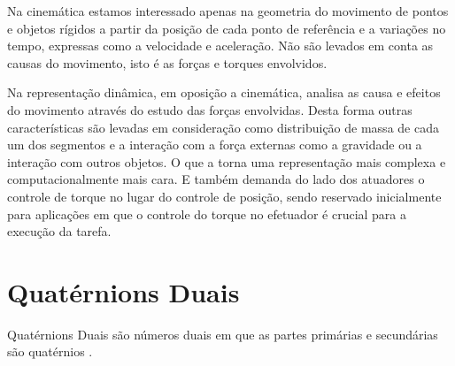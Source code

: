 Na cinemática estamos interessado apenas na geometria do movimento de pontos e objetos rígidos a partir da posição de cada ponto de referência e a variações no tempo, expressas como a velocidade e aceleração. Não são levados em conta as causas do movimento, isto é as forças e torques envolvidos.


Na representação dinâmica, em oposição a cinemática, analisa as causa e efeitos do movimento através do estudo das forças envolvidas. Desta forma outras características são levadas em consideração como distribuição de massa de cada um dos segmentos e a interação com a força externas como a gravidade ou a interação com outros objetos. O que a torna uma representação mais complexa e computacionalmente mais cara. E também demanda do lado dos atuadores o controle de torque no lugar do controle de posição, sendo reservado inicialmente para aplicações em que o controle do torque no efetuador é crucial para a execução da tarefa.




\section{Quatérnions Duais}

Quatérnions Duais são números duais em que as partes primárias e secundárias são quatérnios \cite{nobody}.

